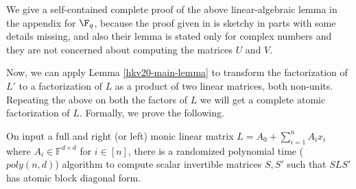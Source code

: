 \begin{remark}
We give a self-contained complete proof of the above linear-algebraic
lemma in the appendix for $\F_q$, because the proof given in
\cite{HKV20} is sketchy in parts with some details missing, and also
their lemma is stated only for complex numbers and they are not
concerned about computing the matrices $U$ and $V$.
\end{remark}

Now, we can apply Lemma \ref{hkv20-main-lemma} to transform the
factorization of $L'$ to a factorization of $L$ as a product of two
linear matrices, both non-units. Repeating the above on both the
factors of $L$ we will get a complete atomic factorization of
$L$. Formally, we prove the following.

\begin{theorem}\label{lfact2}
On input a full and right (or left) monic linear matrix $L= A_0 +
\sum_{i=1}^n A_i x_i$ where $A_i \in \mathbb{F}^{d \times d}$ for $i\in
    [n]$, there is a randomized polynomial time ($poly(n,d)$)
    algorithm to compute scalar invertible matrices $S,S'$ such that
    $SLS'$ has atomic block diagonal form.
\end{theorem}

